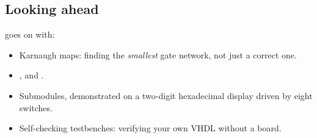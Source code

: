 \subsection*{Looking ahead}
 goes on with:
\begin{itemize}
  \item Karnaugh maps: finding the \emph{smallest} gate network, not just a correct one.
  \item {},  and .
  \item Submodules, demonstrated on a two-digit hexadecimal display driven by eight switches.
  \item Self-checking testbenches: verifying your own VHDL without a board.
\end{itemize}

